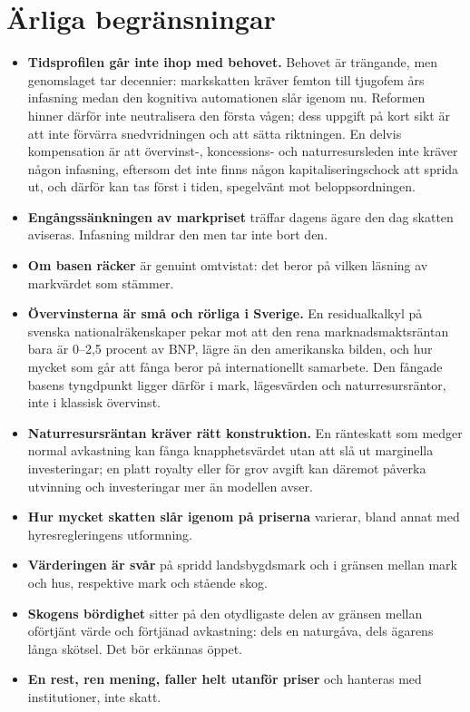 \documentclass[11pt]{article}
\begin{document}
\section{Ärliga begränsningar}

\begin{itemize}
\item \textbf{Tidsprofilen går inte ihop med behovet.} Behovet är trängande, men genomslaget tar decennier: markskatten kräver femton till tjugofem års infasning medan den kognitiva automationen slår igenom nu. Reformen hinner därför inte neutralisera den första vågen; dess uppgift på kort sikt är att inte förvärra snedvridningen och att sätta riktningen. En delvis kompensation är att övervinst-, koncessions- och naturresursleden inte kräver någon infasning, eftersom det inte finns någon kapitaliseringschock att sprida ut, och därför kan tas först i tiden, spegelvänt mot beloppsordningen.
\item \textbf{Engångssänkningen av markpriset} träffar dagens ägare den dag skatten aviseras. Infasning mildrar den men tar inte bort den.
\item \textbf{Om basen räcker} är genuint omtvistat: det beror på vilken läsning av markvärdet som stämmer.
\item \textbf{Övervinsterna är små och rörliga i Sverige.} En residualkalkyl på svenska nationalräkenskaper pekar mot att den rena marknadsmaktsräntan bara är 0--2,5 procent av BNP, lägre än den amerikanska bilden, och hur mycket som går att fånga beror på internationellt samarbete. Den fångade basens tyngdpunkt ligger därför i mark, lägesvärden och naturresursräntor, inte i klassisk övervinst.
\item \textbf{Naturresursräntan kräver rätt konstruktion.} En ränteskatt som medger normal avkastning kan fånga knapphetsvärdet utan att slå ut marginella investeringar; en platt royalty eller för grov avgift kan däremot påverka utvinning och investeringar mer än modellen avser.
\item \textbf{Hur mycket skatten slår igenom på priserna} varierar, bland annat med hyresregleringens utformning.
\item \textbf{Värderingen är svår} på spridd landsbygdsmark och i gränsen mellan mark och hus, respektive mark och stående skog.
\item \textbf{Skogens bördighet} sitter på den otydligaste delen av gränsen mellan oförtjänt värde och förtjänad avkastning: dels en naturgåva, dels ägarens långa skötsel. Det bör erkännas öppet.
\item \textbf{En rest, ren mening, faller helt utanför priser} och hanteras med institutioner, inte skatt.
\end{itemize}
\end{document}

